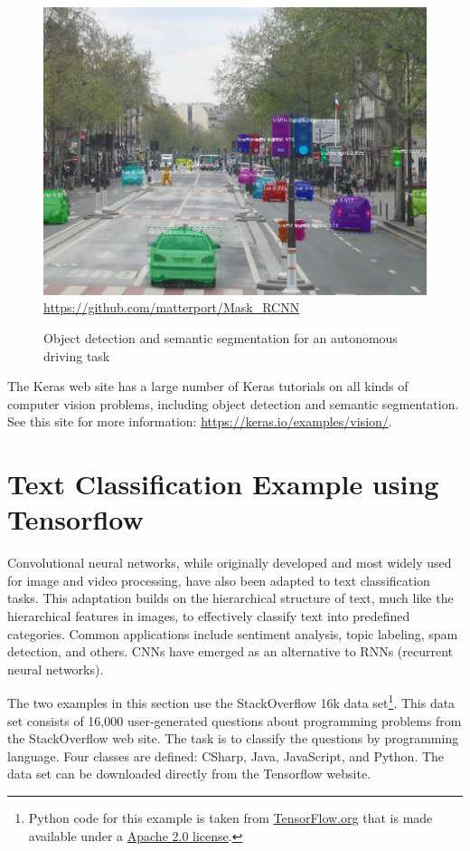 \begin{figure}
\centering
\includegraphics[width=.5\textwidth]{street.png} \\

\scriptsize \url{https://github.com/matterport/Mask_RCNN}
\caption[Object detection and semantic segmentation example]{Object detection and semantic segmentation for an autonomous driving task}
\label{fig:street}
\end{figure}

\begin{tcolorbox}[colback=code]
The Keras web site has a large number of Keras tutorials on all kinds of computer vision problems, including object detection and semantic segmentation. See this site for more information: \footnotesize\url{https://keras.io/examples/vision/}\normalsize.
\end{tcolorbox}

\section{Text Classification Example using Tensorflow}

Convolutional neural networks, while originally developed and most widely used for image and video processing, have also been adapted to text classification tasks. This adaptation builds on the hierarchical structure of text, much like the hierarchical features in images, to effectively classify text into predefined categories. Common applications include sentiment analysis, topic labeling, spam detection, and others. CNNs have emerged as an alternative to RNNs (recurrent neural networks).

The two examples in this section use the StackOverflow 16k data set\footnote{Python code for this example is taken from \href{https://www.tensorflow.org/tutorials/load_data/text}{TensorFlow.org} that is made available under a \href{https://www.apache.org/licenses/LICENSE-2.0}{Apache 2.0 license}.}. This data set consists of 16,000 user-generated questions about programming problems from the StackOverflow web site. The task is to classify the questions by programming language. Four classes are defined: CSharp, Java, JavaScript, and Python. The data set can be downloaded directly from the Tensorflow website.

